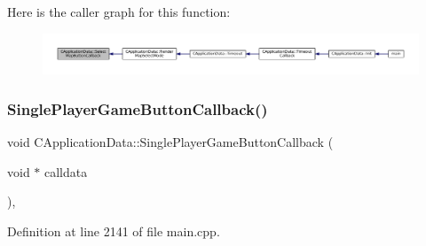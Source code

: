 Here is the caller graph for this function\+:\nopagebreak
\begin{figure}[H]
\begin{center}
\leavevmode
\includegraphics[width=350pt]{classCApplicationData_a5f915dc03205b67ca79f4dcfd7b43f5a_icgraph}
\end{center}
\end{figure}
\hypertarget{classCApplicationData_a239a28599cbb6762c21306a4a03c6202}{}\label{classCApplicationData_a239a28599cbb6762c21306a4a03c6202} 
\subsubsection{\texorpdfstring{Single\+Player\+Game\+Button\+Callback()}{SinglePlayerGameButtonCallback()}}
{\footnotesize\ttfamily void C\+Application\+Data\+::\+Single\+Player\+Game\+Button\+Callback (\begin{DoxyParamCaption}\item[{void $\ast$}]{calldata }\end{DoxyParamCaption})\hspace{0.3cm}{\ttfamily [static]}, {\ttfamily [protected]}}



Definition at line 2141 of file main.\+cpp.


